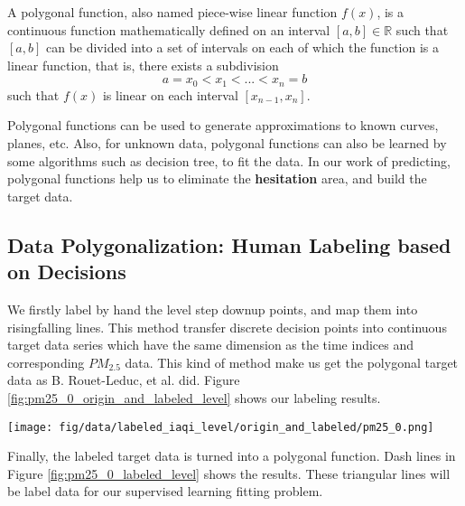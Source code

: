 \documentclass[
twocolumn,
]{ceurart}
\begin{document}
A polygonal function, also named piece-wise linear function $f(x)$, is a continuous function mathematically defined on an interval $[a, b]\in \mathbb R$ such that $[a, b]$ can be divided into a set of intervals on each of which the function is a linear function, that is, there exists a subdivision 
\begin{equation}
    a=x_0 < x_1 < ... < x_n=b
\end{equation}
such that $f(x)$ is linear on each interval $[x_{n-1}, x_n]$.

Polygonal functions can be used to generate approximations to known curves, planes, etc. Also, for unknown data, polygonal functions can also be learned by some algorithms such as decision tree, to fit the data. In our work of predicting, polygonal functions help us to eliminate the \textbf{hesitation} area, and build the target data.

\subsection{Data Polygonalization: Human Labeling based on Decisions}

We firstly label by hand the level step down\/up points, and map them into rising\/falling lines. This method transfer discrete decision points into continuous target data series which have the same dimension as the time indices and corresponding $PM_{2.5}$ data. This kind of method make us get the polygonal target data as B. Rouet-Leduc, et al. \cite{rouet2017machine} did. Figure \ref{fig:pm25_0_origin_and_labeled_level} shows our labeling results.

\begin{figure*}[!htbp]
    \begin{center}
        \texttt{[image: fig/data/labeled\_iaqi\_level/origin\_and\_labeled/pm25\_0.png]}
        \caption{Sensor 0's $PM_{2.5}$ origin and labeled IAQI level.}
        \label{fig:pm25_0_origin_and_labeled_level}
    \end{center}
\end{figure*}


Finally, the labeled target data is turned into a polygonal function. Dash lines in Figure \ref{fig:pm25_0_labeled_level} shows the results. These triangular lines will be label data for our supervised learning fitting problem.
\end{document}
